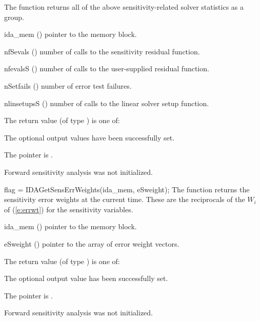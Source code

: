 {
  The function  returns all of the above sensitivity-related solver
  statistics as a group.
}
{
  \begin{args}
  \item[ida\_mem] ()
    pointer to the {\idas} memory block.
  \item[nfSevals] ()
    number of calls to the sensitivity residual function.
  \item[nfevalsS] ()
    number of calls to the user-supplied residual function.
  \item[nSetfails] ()
    number of error test failures.
  \item[nlinsetupsS] ()
    number of calls to the linear solver setup function.
  \end{args}
}
{
  The return value  (of type ) is one of:
  \begin{args}
  \item[\Id{IDA\_SUCCESS}] 
    The optional output values have been successfully set.
  \item[\Id{IDA\_MEM\_NULL}]
    The  pointer is .
  \item[\Id{IDA\_NO\_SENS}]
    Forward sensitivity analysis was not initialized.
  \end{args}
}
{}
{
  flag = IDAGetSensErrWeights(ida\_mem, eSweight);
}
{
  The function  returns the sensitivity error weights at the
  current time. These are the reciprocals of the $W_i$ of (\ref{e:errwt}) for the
  sensitivity variables.
}
{
  \begin{args}
  \item[ida\_mem] ()
    pointer to the {\idas} memory block.
  \item[eSweight] ()
    pointer to the array of error weight vectors.
  \end{args}
}
{
  The return value  (of type ) is one of:
  \begin{args}
  \item[\Id{IDA\_SUCCESS}] 
    The optional output value has been successfully set.
  \item[\Id{IDA\_MEM\_NULL}]
    The  pointer is .
  \item[\Id{IDA\_NO\_SENS}]
    Forward sensitivity analysis was not initialized.
  \end{args}
}

